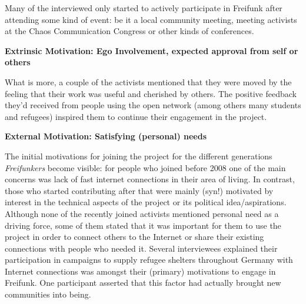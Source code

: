 Many of the interviewed only started to actively participate in Freifunk after attending some kind of event: be it a local community meeting, meeting activists at the Chaos Communication Congress or other kinds of conferences.


\textbf{Extrinsic Motivation: Ego Involvement, expected approval from self or others}

What is more, a couple of the activists mentioned that they were moved by the feeling that their work was useful and cherished by others.
The positive feedback they'd received from people using the open network (among others many students and refugees) inspired them to continue their engagement in the project.


\textbf{External Motivation: Satisfying (personal) needs}

The initial motivations for joining the project for the different generations \textit{Freifunkers} become visible:
for people who joined before 2008 one of the main concerns was lack of fast internet connections in their area of living.
In contrast, those who started contributing after that were mainly (syn!) motivated by interest in the technical aspects of the project or its political idea/aspirations.
Although none of the recently joined activists mentioned personal need as a driving force,
some of them stated that it was important for them to use the project in order to connect others to the Internet or share their existing connections with people who needed it.
Several interviewees explained their participation in campaigns to supply refugee shelters throughout Germany with Internet connections was amongst their (primary) motivations to engage in Freifunk.
One participant asserted that this factor had actually brought new communities into being.


